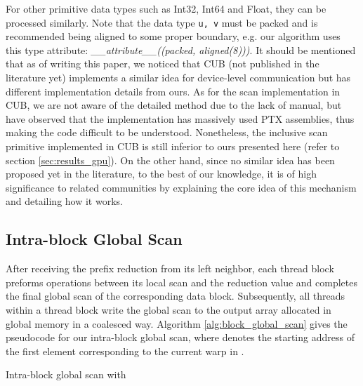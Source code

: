 \documentclass[article]{elsarticle}
\renewcommand{\hl}[1]{#1}
\begin{document}
{For other primitive data types such as Int32, Int64 and Float, they can be processed similarly. Note that the data type \hbox{{\tt u, v}} must be packed and is recommended being aligned to some proper boundary, e.g. our algorithm uses this type attribute: \textit{\_\_attribute\_\_((packed, aligned(8)))}. It should be mentioned that as of writing this paper, we noticed that CUB \cite{cub} (not published in the literature yet) implements a similar idea for device-level communication but has different implementation details from ours. \hl{As for the scan implementation in CUB, we are not aware of the detailed method due to the lack of manual, but have observed that the implementation has massively used PTX assemblies, thus making the code difficult to be understood}. Nonetheless, the inclusive scan primitive implemented in CUB is still inferior to ours presented here (refer to section \ref{sec:results_gpu}). On the other hand, since no similar idea has been proposed yet in the literature, to the best of our knowledge, it is of high significance to related communities by explaining the core idea of this mechanism and detailing how it works.
\subsection{Intra-block Global Scan}
After receiving the prefix reduction from its left neighbor, each thread block preforms  operations between its local scan and the reduction value and completes the final global scan of the corresponding data block. Subsequently, all threads within a thread block write the global scan to the output array  allocated in global memory in a coalesced way. Algorithm \ref{alg:block_global_scan} gives the pseudocode for our intra-block global scan, where  denotes the starting address of the first element corresponding to the current warp in .
\begin{algorithm}[!h]
\caption{Intra-block global scan with }
\label{alg:block_global_scan}
\fontsize{8pt}{8.05pt}\selectfont
\begin{algorithmic}[1]

	\State{;}
    \State{;}
    \State{;}
    \State{;}
    
    \State{}
    \State{;}
    \State{;}
    \State{;}
\EndProcedure
\end{algorithmic}
\end{algorithm}
}
\end{document}
